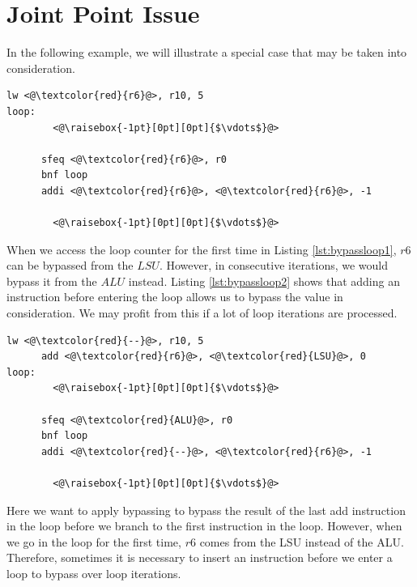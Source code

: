 

\section{Joint Point Issue}
In the following example, we will illustrate a special case that may be taken into consideration.

\begin{lstlisting}[caption=Example code fragment where bypassing over backedge of a loop iteration is not possible., label=lst:bypassloop1]
      lw <@\textcolor{red}{r6}@>, r10, 5
loop: 
        <@\raisebox{-1pt}[0pt][0pt]{$\vdots$}@>
      
      sfeq <@\textcolor{red}{r6}@>, r0
      bnf loop
      addi <@\textcolor{red}{r6}@>, <@\textcolor{red}{r6}@>, -1

        <@\raisebox{-1pt}[0pt][0pt]{$\vdots$}@>
\end{lstlisting}

When we access the loop counter for the first time in Listing \ref{lst:bypassloop1}, $r6$ can be bypassed from the $LSU$. However, in consecutive iterations, we would bypass it from the $ALU$ instead. Listing \ref{lst:bypassloop2} shows that adding an instruction before entering the loop allows us to bypass the value in consideration. We may profit from this if a lot of loop iterations are processed.

\begin{lstlisting}[caption=Example code fragment where bypassing over the backedge of a loop iteration is possible., label=lst:bypassloop2]
      lw <@\textcolor{red}{--}@>, r10, 5
      add <@\textcolor{red}{r6}@>, <@\textcolor{red}{LSU}@>, 0
loop: 
        <@\raisebox{-1pt}[0pt][0pt]{$\vdots$}@>
      
      sfeq <@\textcolor{red}{ALU}@>, r0
      bnf loop
      addi <@\textcolor{red}{--}@>, <@\textcolor{red}{r6}@>, -1

        <@\raisebox{-1pt}[0pt][0pt]{$\vdots$}@>
\end{lstlisting}

Here we want to apply bypassing to bypass the result of the last add instruction in the loop before we branch to the first instruction in the loop. However, when we go in the loop for the first time, $r6$ comes from the LSU instead of the ALU. Therefore, sometimes it is necessary to insert an instruction before we enter a loop to bypass over loop iterations.

